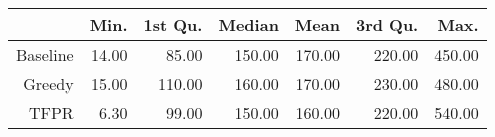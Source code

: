 \begin{table}[ht]
\centering
\begin{tabular}{rrrrrrr}
  \hline
 & Min. & 1st Qu. & Median & Mean & 3rd Qu. & Max. \\ 
  \hline
Baseline & 14.00 & 85.00 & 150.00 & 170.00 & 220.00 & 450.00 \\ 
  Greedy & 15.00 & 110.00 & 160.00 & 170.00 & 230.00 & 480.00 \\ 
  TFPR & 6.30 & 99.00 & 150.00 & 160.00 & 220.00 & 540.00 \\ 
   \hline
\end{tabular}
\end{table}
